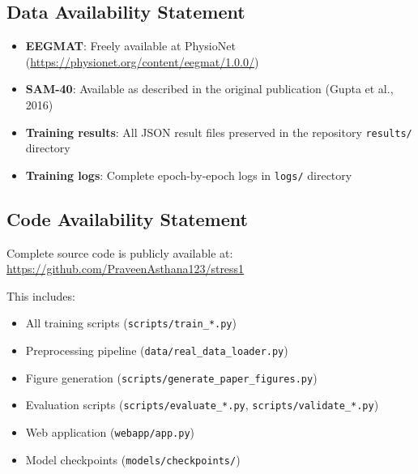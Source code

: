 \documentclass[11pt,a4paper]{article}
\begin{document}
\subsection{Data Availability Statement}
\begin{itemize}[leftmargin=*]
\item \textbf{EEGMAT}: Freely available at PhysioNet (\url{https://physionet.org/content/eegmat/1.0.0/})
\item \textbf{SAM-40}: Available as described in the original publication (Gupta et al., 2016)
\item \textbf{Training results}: All JSON result files preserved in the repository \texttt{results/} directory
\item \textbf{Training logs}: Complete epoch-by-epoch logs in \texttt{logs/} directory
\end{itemize}

\subsection{Code Availability Statement}
Complete source code is publicly available at:\\
\url{https://github.com/PraveenAsthana123/stress1}

\noindent This includes:
\begin{itemize}[leftmargin=*,nosep]
\item All training scripts (\texttt{scripts/train\_*.py})
\item Preprocessing pipeline (\texttt{data/real\_data\_loader.py})
\item Figure generation (\texttt{scripts/generate\_paper\_figures.py})
\item Evaluation scripts (\texttt{scripts/evaluate\_*.py}, \texttt{scripts/validate\_*.py})
\item Web application (\texttt{webapp/app.py})
\item Model checkpoints (\texttt{models/checkpoints/})
\end{itemize}
\end{document}
